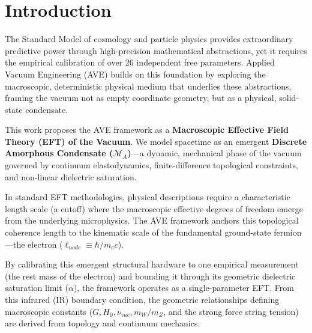 \chapter*{Introduction}

The Standard Model of cosmology and particle physics provides extraordinary predictive power through high-precision mathematical abstractions, yet it requires the empirical calibration of over 26 independent free parameters. Applied Vacuum Engineering (AVE) builds on this foundation by exploring the macroscopic, deterministic physical medium that underlies these abstractions, framing the vacuum not as empty coordinate geometry, but as a physical, solid-state condensate.

This work proposes the AVE framework as a \textbf{Macroscopic Effective Field Theory (EFT) of the Vacuum}. We model spacetime as an emergent \textbf{Discrete Amorphous Condensate ($\mathcal{M}_A$)}---a dynamic, mechanical phase of the vacuum governed by continuum elastodynamics, finite-difference topological constraints, and non-linear dielectric saturation.

In standard EFT methodologies, physical descriptions require a characteristic length scale (a cutoff) where the macroscopic effective degrees of freedom emerge from the underlying microphysics. The AVE framework anchors this topological coherence length to the kinematic scale of the fundamental ground-state fermion---the electron ($\ell_{node} \equiv \hbar / m_e c$).

By calibrating this emergent structural hardware to one empirical measurement (the rest mass of the electron) and bounding it through its geometric dielectric saturation limit ($\alpha$), the framework operates as a single-parameter EFT. From this infrared (IR) boundary condition, the geometric relationships defining macroscopic constants ($G, H_0, \nu_{vac}, m_W/m_Z$, and the strong force string tension) are derived from topology and continuum mechanics.

